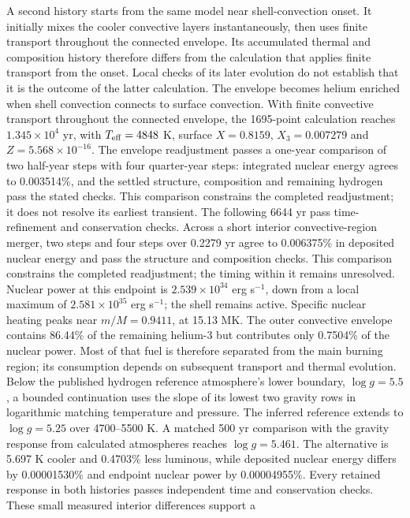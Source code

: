 \documentclass[11pt,letterpaper]{article}
\begin{document}
A second history starts from the same model near shell-convection onset.
It initially mixes the cooler convective layers instantaneously, then uses
finite transport throughout the connected envelope. Its accumulated thermal
and composition history therefore differs from the calculation that applies
finite transport from the onset. Local checks of its later evolution do not
establish that it is the outcome of the latter calculation.
The envelope becomes helium enriched when shell convection connects to
surface convection. With finite convective transport throughout the connected
envelope, the 1695-point calculation reaches $1.345\times10^4$ yr, with
$T_{\rm eff}=4848$ K, surface $X=0.8159$, $X_3=0.007279$ and
$Z=5.568\times10^{-16}$. The envelope readjustment passes a one-year
comparison of two half-year steps with four quarter-year steps: integrated
nuclear energy agrees to 0.003514\%, and the settled structure, composition
and remaining hydrogen pass the stated checks. This comparison constrains
the completed readjustment; it does not resolve its earliest transient.
The following 6644 yr pass time-refinement and conservation checks. Across
a short interior convective-region merger, two steps and four steps over
0.2279 yr agree to 0.006375\% in deposited nuclear energy and pass the
structure and composition checks. This comparison constrains the completed
readjustment; the timing within it remains unresolved. Nuclear power at this endpoint is
$2.539\times10^{34}$ erg s$^{-1}$, down from a local maximum of
$2.581\times10^{35}$ erg s$^{-1}$; the shell remains active.
Specific nuclear heating peaks near $m/M=0.9411$, at 15.13 MK.
The outer convective envelope contains 86.44\% of the remaining helium-3
but contributes only 0.7504\% of the nuclear power. Most of that fuel is
therefore separated from the main burning region; its consumption depends
on subsequent transport and thermal evolution.
Below the published hydrogen reference atmosphere's lower boundary,
$\log g=5.5$, a bounded continuation uses the slope of its lowest two
gravity rows in logarithmic matching temperature and pressure.
The inferred reference extends to $\log g=5.25$ over 4700--5500 K.
A matched 500 yr comparison with the gravity response from calculated
atmospheres reaches $\log g=5.461$. The alternative is 5.697 K cooler and
0.4703\% less luminous, while deposited nuclear energy differs by
0.00001530\% and endpoint nuclear power by 0.00004955\%.
Every retained response in both histories passes independent time and
conservation checks. These small measured interior differences support a
\end{document}
